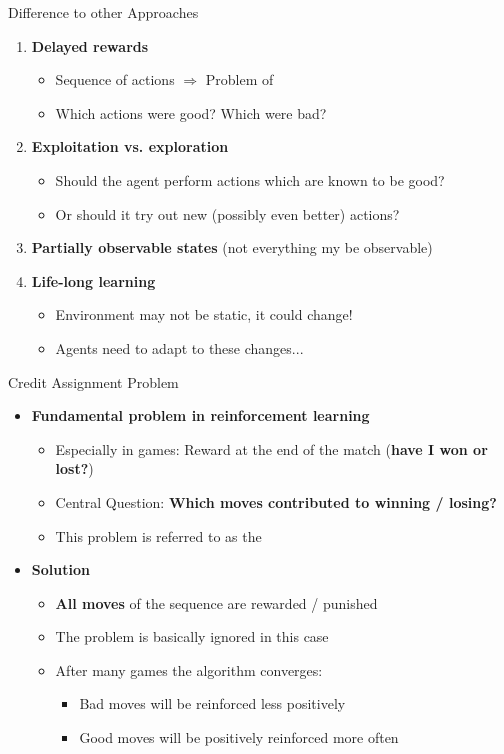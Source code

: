 \begin{frame}{Difference to other Approaches}{}
	\begin{enumerate}
		\item \textbf{Delayed rewards}
		\begin{itemize}
			\item Sequence of actions $\Rightarrow$ Problem of 
			\item Which actions were good? Which were bad?
		\end{itemize}
		\item \textbf{Exploitation vs. exploration}
		\begin{itemize}
			\item Should the agent perform actions which are known to be good?
			\item Or should it try out new (possibly even better) actions?
		\end{itemize}
		\item \textbf{Partially observable states} (not everything my be observable)
		\item \textbf{Life-long learning} 
		\begin{itemize}
			\item Environment may not be static, it could change!
			\item Agents need to adapt to these changes...
		\end{itemize}
	\end{enumerate}
\end{frame}


\begin{frame}{Credit Assignment Problem}{}
	\begin{itemize}
		\item \textbf{Fundamental problem in reinforcement learning}
		\begin{itemize}
			\item Especially in games: Reward at the end of the match (\textbf{have I won or lost?})
			\item Central Question: \textbf{Which moves contributed to winning / losing?}
			\item This problem is referred to as the 
		\end{itemize}
		\item \textbf{Solution}
		\begin{itemize}
			\item \textbf{All moves} of the sequence are rewarded / punished
			\item The problem is basically ignored in this case
			\item After many games the algorithm converges:
			\begin{itemize}
				\item Bad moves will be reinforced less positively
				\item Good moves will be positively reinforced more often
			\end{itemize}
		\end{itemize}
	\end{itemize}
\end{frame}


